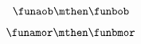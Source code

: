 {\begin{forslides}
        \begin{equation}
            \label{eq:cats-of-structures-09}
            \funaob \mthen \funbob
        \end{equation}

        \begin{equation}
            \label{eq:cats-of-structures-10}
            \funamor \mthen \funbmor
        \end{equation}


\end{forslides}}
